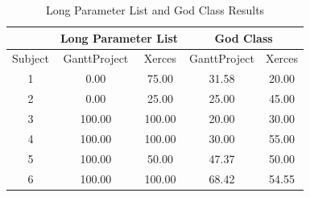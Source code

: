 \documentclass[conference]{IEEEtran}
\begin{document}


\begin{table}[h]
\centering
\caption{Long Parameter List and God Class Results}
\label{tab:results1}
\begin{tabular}{c|cc|cc}
\multicolumn{1}{l|}{}    & \multicolumn{2}{c|}{Long Parameter List} & \multicolumn{2}{c}{God Class} \\ \hline
\multicolumn{1}{c|}{Subject} & GanttProject           & Xerces          & GanttProject      & Xerces     \\ \hline
\multicolumn{1}{c|}{1}  & 0.00                   & 75.00           & 31.58             & 20.00      \\
\multicolumn{1}{c|}{2}  & 0.00                   & 25.00           & 25.00             & 45.00      \\
\multicolumn{1}{c|}{3}  & 100.00                 & 100.00          & 20.00             & 30.00      \\
\multicolumn{1}{c|}{4}  & 100.00                 & 100.00          & 30.00             & 55.00      \\
\multicolumn{1}{c|}{5}  & 100.00                 & 50.00           & 47.37             & 50.00      \\
\multicolumn{1}{c|}{6}  & 100.00                 & 100.00          & 68.42             & 54.55      \\ \hline
\end{tabular}
\end{table}
\end{document}
